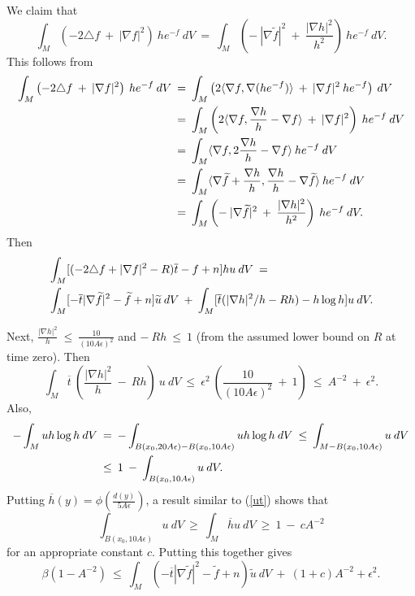 We claim that
\begin{equation}
\int_M \left( - 2 \triangle f \: + \: |\nabla f|^2 \right) \: h e^{-f} \:
dV \: = \: \int_M \left( - \: |\nabla \widetilde{f}|^2 \: + \:
\frac{|\nabla h|^2}{h^2} \right) \: he^{-f} \: dV.
\end{equation}
This follows from
\begin{align}
\int_M \left( - 2 \triangle f \: + \: |\nabla f|^2 \right) \: h e^{-f} \:
dV \: & = \:
\int_M \left( 2 \langle \nabla f, \nabla(he^{-f}) \rangle \: + \:
|\nabla f|^2 \: h e^{-f} \right) \:
dV \\
& = \: \int_M \left( 2 \langle \nabla f, \frac{\nabla h}{h} -
\nabla f \rangle \: + \:
|\nabla f|^2  \right) \: h e^{-f} \:
dV \notag \\
& = \: \int_M \langle \nabla f, 2 \frac{\nabla h}{h} -
\nabla f \rangle \: h e^{-f} \: dV \notag \\
& = \:
\int_M \langle \nabla \widetilde{f} + \frac{\nabla h}{h}, \frac{\nabla h}{h} -
\nabla \widetilde{f} \rangle \: h e^{-f} \: dV \notag \\
& = \:
\int_M \left( - \: |\nabla \widetilde{f}|^2 \: + \:
\frac{|\nabla h|^2}{h^2} \right) \: he^{-f} \: dV. \notag
\end{align}
Then
\begin{align}
& \int_M [(-2\triangle f + |\nabla f|^2 - R) \overline{t}
- f + n]hu \: dV \: = \\
& \int_M [- \overline{t} |\nabla \widetilde{f}|^2 - \widetilde{f} + n]
\widetilde{u} \: dV \: + \:
\int_M [\overline{t}(|\nabla h|^2/h - Rh) - h \log h ] u \: dV. \notag
\end{align}

Next, $\frac{|\nabla h|^2}{h} \: \le \: \frac{10}{(10A\epsilon)^2}$ and
$- \: Rh \: \le \: 1$ (from the assumed lower bound on $R$ at time zero). Then
\begin{equation}
\int_M \overline{t} \: \left( \frac{|\nabla h|^2}{h} \: - \: R h \right)
\: u \: dV \: \le \: \epsilon^2 \: \left( \frac{10}{(10A\epsilon)^2} \: + \:
1 \right) \: \le \: A^{-2} \: + \: \epsilon^2.
\end{equation}
Also,
\begin{align}
- \int_M uh \log{h} \: dV \: & = \: -
\int_{B(x_0, 20 A \epsilon) - B(x_0, 10 A \epsilon)} uh \log{h} \: dV \:
\le \: \int_{M - B(x_0, 10 A \epsilon)} u \: dV \\
&\le \: 1 \: - \: \int_{B(x_0, 10 A \epsilon)} u \: dV. \notag
\end{align}
Putting $\overline{h}(y) = \phi \left( \frac{d(y)}{5A\epsilon} \right)$, a result
similar to (\ref{ut}) shows that
\begin{equation}
\int_{B(x_0, 10 A \epsilon)} u \: dV \: \ge \:
\int_{M} \overline{h} u \: dV \: \ge \:
 1 \: - \: c A^{-2}
 \end{equation}
for an appropriate constant $c$.
Putting this together gives
\begin{equation} \label{somme}
\beta(1 - A^{-2}) \: \le \: \int_M \left( - \overline{t} |\nabla \widetilde{f}|^2 - \widetilde{f} + n
\right)
\widetilde{u} \: dV \: + \: (1+c) A^{-2} + \epsilon^2.
\end{equation}


